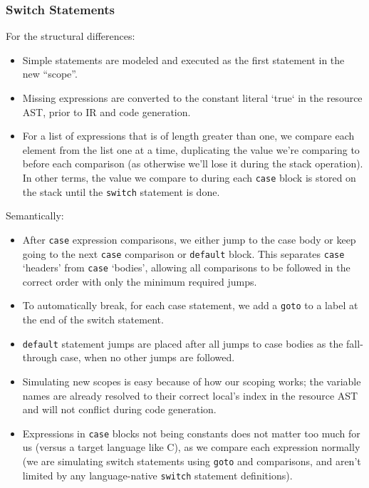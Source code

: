 \documentclass[11pt]{article}
\begin{document}
\subsubsection{Switch Statements}
\label{sec:switch-stmts-codegen}
For the structural differences:
\begin{itemize}
\item Simple statements are modeled and executed as the first
  statement in the new ``scope''.
\item Missing expressions are converted to the constant literal `true`
  in the resource AST, prior to IR and code generation.
\item For a list of expressions that is of length greater than one, we
  compare each element from the list one at a time, duplicating the
  value we're comparing to before each comparison (as otherwise we'll
  lose it during the stack operation). In other terms, the value we
  compare to during each \texttt{case} block is stored on the stack
  until the \texttt{switch} statement is done.
\end{itemize}

\noindent Semantically:

\begin{itemize}
\item After \texttt{case} expression comparisons, we either jump to
  the case body or keep going to the next \texttt{case} comparison or
  \texttt{default} block. This separates \texttt{case} `headers' from
  \texttt{case} `bodies', allowing all comparisons to be followed in
  the correct order with only the minimum required jumps.
\item To automatically break, for each case statement, we add a
  \texttt{goto} to a label at the end of the switch statement.
\item \texttt{default} statement jumps are placed after all jumps to
  case bodies as the fall-through case, when no other jumps are
  followed.
\item Simulating new scopes is easy because of how our scoping works;
  the variable names are already resolved to their correct local's
  index in the resource AST and will not conflict during code
  generation.
\item Expressions in \texttt{case} blocks not being constants does not
  matter too much for us (versus a target language like C), as we
  compare each expression normally (we are simulating switch
  statements using \texttt{goto} and comparisons, and aren't limited
  by any language-native \texttt{switch} statement definitions).
\end{itemize}
\end{document}

